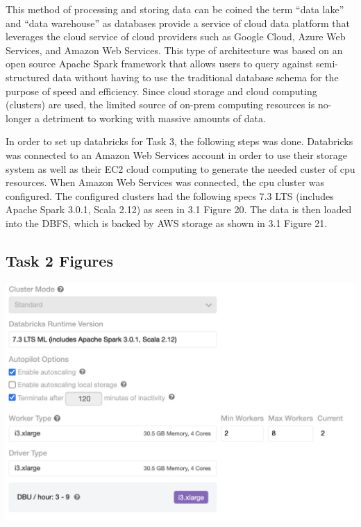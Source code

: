 \documentclass[12pt]{article}
\begin{document}
\begin{multicols*}{2}
  \hspace*{5mm} This method of processing and storing data can be coined the term “data lake” and “data warehouse” as databases provide a service of cloud data platform that 
  leverages the cloud service of cloud providers such as Google Cloud, Azure Web Services, and Amazon Web Services. This type of architecture was based on an open source 
  Apache Spark framework that allows users to query against semi-structured data without having to use the traditional database schema for the purpose of speed and efficiency. 
  Since cloud storage and cloud computing (clusters) are used, the limited source of on-prem computing resources is no-longer a detriment to working with massive amounts of data. 

  \hspace*{5mm} In order to set up databricks for Task 3, the following steps was done. Databricks was connected to an Amazon Web Services account in order to use their storage system as well as their EC2
  cloud computing to generate the needed custer of cpu resources. When Amazon Web Services was connected, the cpu cluster was configured. The configured clusters had the following specs 7.3 LTS 
  (includes Apache Spark 3.0.1, Scala 2.12) as seen in 3.1 Figure 20. The data is then loaded into the DBFS, which is backed by AWS storage as shown in 3.1 Figure 21. 

  \subsection{Task 2 Figures}
  \begin{center}
	\includegraphics[scale=0.4]{../screenshot/cpu_cluster.png}


\end{center}
\end{multicols*}
\end{document}
